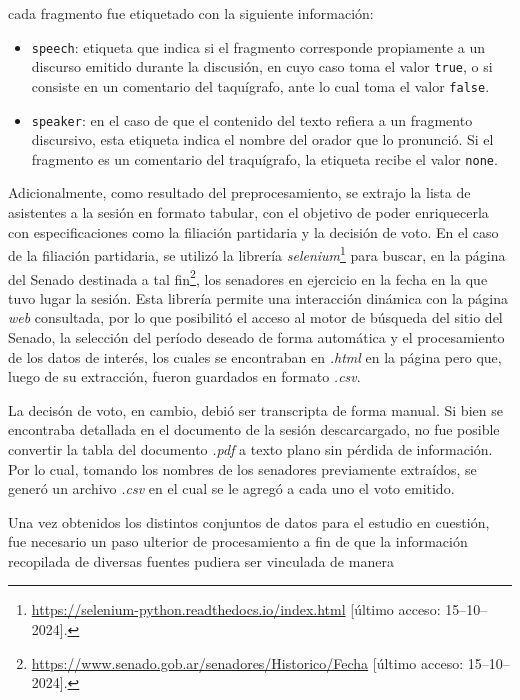 cada fragmento fue etiquetado con la siguiente informaci\'on:
\begin{itemize}
    \item \texttt{speech}: etiqueta que indica si el fragmento corresponde
    propiamente a un discurso emitido durante la discusi\'on, en cuyo caso toma el
    valor \texttt{true}, o si consiste en un comentario del taqu\'igrafo, ante lo cual
    toma el valor \texttt{false}.
    \item \texttt{speaker}: en el caso de que el contenido del texto refiera a
    un fragmento discursivo, esta etiqueta indica el nombre del orador que lo
    pronunci\'o. Si el fragmento es un comentario del traqu\'igrafo, la etiqueta
    recibe el valor \texttt{none}.
\end{itemize}
\par
Adicionalmente, como resultado del preprocesamiento, se extrajo la lista de
asistentes a la sesi\'on en formato tabular, con el objetivo de poder
enriquecerla con especificaciones como la filiaci\'on partidaria y la
decisi\'on de voto. En el caso de la filiaci\'on partidaria, se utiliz\'o la
librer\'ia \textit{selenium}\footnote{\url{https://selenium-python.readthedocs.io/index.html}
[\'ultimo acceso: 15--10--2024].}
para buscar, en la {p\'agina} del Senado destinada a tal
fin\footnote{\url{https://www.senado.gob.ar/senadores/Historico/Fecha}
[\'ultimo acceso: 15--10--2024].},
los senadores en ejercicio en la fecha en la que tuvo lugar la sesi\'on.
Esta librer\'ia permite una interacci\'on din\'amica con la p\'agina \textit{web} consultada,
por lo que posibilit\'o el acceso al motor de b\'usqueda del sitio del Senado, la selecci\'on
del per\'iodo deseado de forma autom\'atica y el procesamiento de los datos de inter\'es,
los cuales se encontraban en \textit{.html} en la p\'agina pero que, luego de su
extracci\'on, fueron guardados en formato \textit{.csv}.
\par
La decis\'on de voto, en cambio, debi\'o ser transcripta de forma manual. Si bien
se encontraba detallada en el documento de la sesi\'on descarcargado, no fue posible
convertir la tabla del documento \textit{.pdf} a texto plano sin p\'erdida de informaci\'on.
Por lo cual, tomando los nombres de los senadores previamente extra\'idos, se gener\'o
un archivo \textit{.csv} en el cual se le agreg\'o a cada uno el voto emitido.
\par
Una vez obtenidos los distintos conjuntos de datos para el estudio en cuesti\'on,
fue necesario un paso ulterior de procesamiento a fin de que la informaci\'on
recopilada de diversas fuentes pudiera ser vinculada de manera
